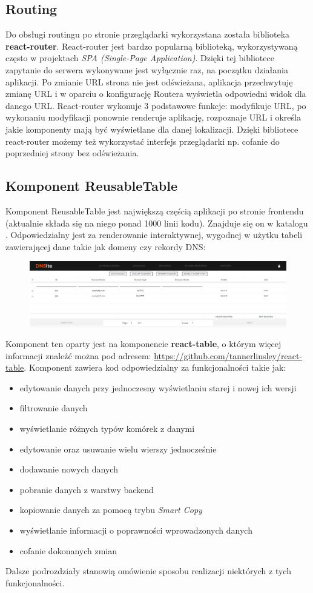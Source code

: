 \documentclass[11pt]{article}
\begin{document}
\subsection{Routing}
Do obsługi routingu po stronie przeglądarki wykorzystana została biblioteka \textbf{react-router}. React-router jest bardzo popularną biblioteką, wykorzystywaną często w projektach \emph{SPA (Single-Page Application)}. Dzięki tej bibliotece zapytanie do serwera wykonywane jest wyłącznie raz, na początku działania aplikacji. Po zmianie URL strona nie jest odświeżana, aplikacja przechwytuję zmianę URL i w oparciu o konfigurację Routera wyświetla odpowiedni widok dla danego URL. React-router wykonuje 3 podstawowe funkcje: modyfikuje URL, po wykonaniu modyfikacji ponownie renderuje aplikację, rozpoznaje URL i określa jakie komponenty mają być wyświetlane dla danej lokalizacji. Dzięki bibliotece react-router możemy też wykorzystać interfejs przeglądarki np. cofanie do poprzedniej strony bez odświeżania. 

\subsection{Komponent ReusableTable}
Komponent ReusableTable jest największą częścią aplikacji po stronie frontendu (aktualnie składa się na niego ponad 1000 linii kodu). Znajduje się on w katalogu . Odpowiedzialny jest za renderowanie interaktywnej, wygodnej w użytku tabeli zawierającej dane takie jak domeny czy rekordy DNS:
\begin{figure}[H]
\centering
\includegraphics[width=\textwidth]{res/front_tabela}
\end{figure}
Komponent ten oparty jest na komponencie \textbf{react-table}, o którym więcej informacji znaleźć można pod adresem: \url{https://github.com/tannerlinsley/react-table}.
Komponent zawiera kod odpowiedzialny za funkcjonalności takie jak:
\begin{itemize}
\item edytowanie danych przy jednoczesny wyświetlaniu starej i nowej ich wersji
\item filtrowanie danych
\item wyświetlanie różnych typów komórek z danymi
\item edytowanie oraz usuwanie wielu wierszy jednocześnie
\item dodawanie nowych danych
\item pobranie danych z warstwy backend
\item kopiowanie danych za pomocą trybu \emph{Smart Copy}
\item wyświetlanie informacji o poprawności wprowadzonych danych
\item cofanie dokonanych zmian
\end{itemize}
Dalsze podrozdziały stanowią omówienie sposobu realizacji niektórych z tych funkcjonalności.
\end{document}
